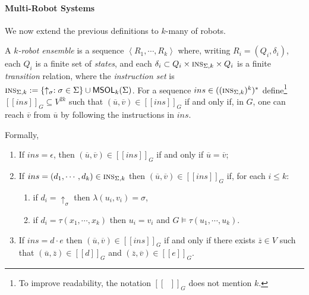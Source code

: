 \documentclass{aamas2015}
\newcommand{\tup}[1]{\overline{#1}}
\newcommand{\tpl}[1]{\left<{#1}\right>}
\def\ins{\textsc{ins}}
\def\msol{\mathsf{MSOL}}
\begin{document}
\paragraph{Multi-Robot Systems} We now extend the previous definitions to $k$-many of robots.  

A {\em $k$-robot ensemble} is a sequence $\tpl{R_1, \cdots, R_k}$ where, writing $R_i = (Q_i,\delta_i)$, each $Q_i$ is a finite set of {\em states}, and each $\delta_i \subset Q_i \times \ins_{\Sigma,k} \times Q_i$ is a finite {\em transition} relation, where the {\em instruction set} is $\ins_{\Sigma,k} :=  \{\uparrow_\sigma : \sigma \in \Sigma\} \cup \msol_k(\Sigma)$.
For a sequence $ins \in ((\ins_{\Sigma,k})^k)^*$ define\footnote{To improve readability, the notation $[[\phantom{n}]]_G$ does not mention $k$.}
  $[[ins]]_G \subseteq V^{2k}$ such that $(\tup{u},\tup{v}) \in [[ins]]_G$ if and only if, in $G$, one can reach $\tup{v}$ from $\tup{u}$ by following the instructions in $ins$.
  
 Formally,
  \begin{enumerate}
  \item If $ins = \epsilon$, then $(\tup{u},\tup{v}) \in [[ins]]_G$ if and only if $\tup{u} = \tup{v}$;
  \item If $ins = (d_1,\cdots,d_k) \in \ins_{\Sigma,k}$
  then $(\tup{u},\tup{v}) \in [[ins]]_G$ if, for each $i \leq k$:%
  \begin{enumerate}
  \item if $d_i = \uparrow_\sigma$ then $\lambda(u_i,v_i) = \sigma$,
  \item if $d_i = \tau(x_1,\cdots,x_k)$ then $u_i = v_i$ and $G \models \tau(u_1,\cdots,u_k)$.
  \end{enumerate}
  \item If $ins = d \cdot e$ then $(\tup{u},\tup{v}) \in [[ins]]_G$ if and only if there exists $\tup{z} \in V$ such that $(\tup{u},\tup{z}) \in [[d]]_G$ and $(\tup{z},\tup{v}) \in [[e]]_G$.

\end{enumerate}
\end{document}
